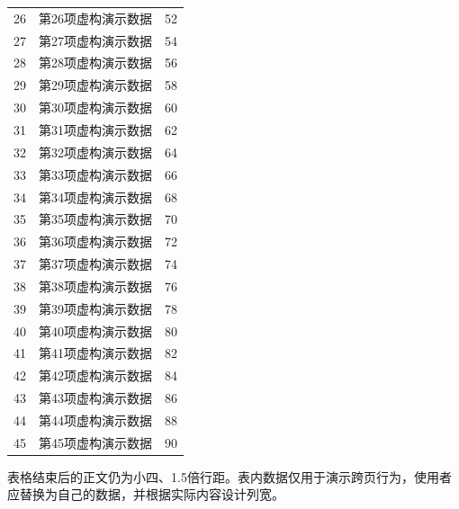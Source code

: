 \begin{longtable}{r p{80mm} r}
  26 & 第26项虚构演示数据 & 52\\
  27 & 第27项虚构演示数据 & 54\\
  28 & 第28项虚构演示数据 & 56\\
  29 & 第29项虚构演示数据 & 58\\
  30 & 第30项虚构演示数据 & 60\\
  31 & 第31项虚构演示数据 & 62\\
  32 & 第32项虚构演示数据 & 64\\
  33 & 第33项虚构演示数据 & 66\\
  34 & 第34项虚构演示数据 & 68\\
  35 & 第35项虚构演示数据 & 70\\
  36 & 第36项虚构演示数据 & 72\\
  37 & 第37项虚构演示数据 & 74\\
  38 & 第38项虚构演示数据 & 76\\
  39 & 第39项虚构演示数据 & 78\\
  40 & 第40项虚构演示数据 & 80\\
  41 & 第41项虚构演示数据 & 82\\
  42 & 第42项虚构演示数据 & 84\\
  43 & 第43项虚构演示数据 & 86\\
  44 & 第44项虚构演示数据 & 88\\
  45 & 第45项虚构演示数据 & 90\\
\end{longtable}
表格结束后的正文仍为小四、1.5倍行距。表内数据仅用于演示跨页行为，使用者应替换为自己的数据，并根据实际内容设计列宽。
